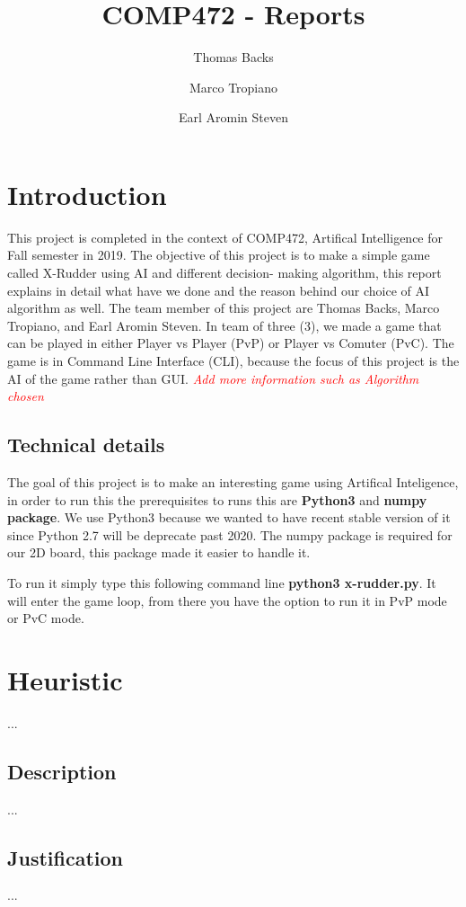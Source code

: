 \documentclass[runningheads]{llncs}
\title{COMP472 - Reports}
\author{Thomas Backs\inst{1} \and Marco Tropiano\inst{2}\and Earl Aromin Steven\inst{3}}
\institute{27554524 - thomasbacks@gmail.com \and 26789331 - tropiano.m@gmail.com \and 40004997 - earlaromin@gmail.com}
\begin{document}
\maketitle

\newpage

\section{Introduction}
This project is completed in the context of COMP472, Artifical Intelligence for Fall semester in 2019.
The objective of this project is to make a simple game called X-Rudder using AI and different decision-
making algorithm, this report explains in detail what have we done and the reason behind our choice of
AI algorithm as well. The team member of this project are Thomas Backs, Marco Tropiano, and Earl Aromin
Steven. In team of three (3), we made a game that can be played in either Player vs Player (PvP) or
Player vs Comuter (PvC). The game is in Command Line Interface (CLI), because the focus of this project
is the AI of the game rather than GUI. \textcolor{red}{\textit{Add more information such as Algorithm chosen}}

\subsection{Technical details}
The goal of this project is to make an interesting game using Artifical Inteligence, in order to run this
the prerequisites to runs this are \textbf{Python3} and \textbf{numpy package}. We use Python3 because we
wanted to have recent stable version of it since Python 2.7 will be deprecate past 2020. The numpy package
is required for our 2D board, this package made it easier to handle it.\newline

To run it simply type this following command line \textbf{python3 x-rudder.py}. It will enter the game
loop, from there you have the option to run it in PvP mode or PvC mode.

\section{Heuristic}
...
\subsection{Description}
...
\subsection{Justification}
...
\end{document}
